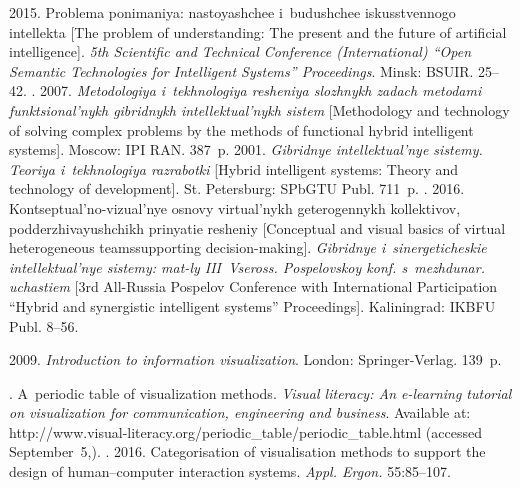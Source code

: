 \begin{multicols}{2}
{{\begin{thebibliography}{99}
 
   2015. Problema ponimaniya: nastoyashchee i~budushchee 
iskusstvennogo intellekta [The problem of understanding: The present and the future 
of artificial intelligence]. \textit{5th Scientific and Technical 
Conference (International) ``Open Semantic 
Technologies for Intelligent Systems'' Proceedings}. Minsk: BSUIR. 
25--42.
  . 2007. \textit{Metodologiya 
i~tekhnologiya resheniya slozhnykh zadach metodami funktsional'nykh gibridnykh 
intellektual'nykh sistem} [Methodology and technology of solving complex problems 
by the methods of functional hybrid intelligent systems]. Moscow: IPI RAN. 387~p.
   2001. \textit{Gibridnye intellektual'nye sistemy. Teoriya 
i~tekhnologiya razrabotki} [Hybrid intelligent systems: Theory and technology of 
development]. St. Petersburg: SPbGTU Publ. 711~p.
  . 2016. Kon\-tsep\-tu\-al'\-no-vi\-zu\-al'\-nye 
osnovy virtual'nykh geterogennykh kollektivov, podderzhivayushchikh prinyatie 
resheniy [Conceptual and visual basics of virtual heterogeneous teams\linebreak supporting 
decision-making]. \textit{Gibridnye i~sinergeticheskie intellektual'nye sistemy: 
mat-ly III~Vseross. Pospelovskoy konf. s~mezhdunar. uchastiem}  
[3rd All-Russia Pospelov Conference with International Participation ``Hybrid and 
synergistic intelligent systems'' Proceedings]. Kaliningrad: IKBFU Publ. 8--56.

\pagebreak

   2009. \textit{Introduction to information visualization}. London: 
Springer-Verlag. 139~p.


  . A~periodic table of visualization methods. 
\textit{Visual 
literacy: An e-learning tutorial on visualization for communication, engineering 
and business}. 
Available at: {\sf http://www.visual-literacy.org/periodic\_\linebreak table/periodic\_table.html} 
(accessed September~5,).
  . 2016. Categorisation 
of visualisation methods to support the design of human--computer interaction 
systems. \textit{Appl. Ergon.} 55:85--107.
\end{thebibliography}

 }
 }

\end{multicols}

